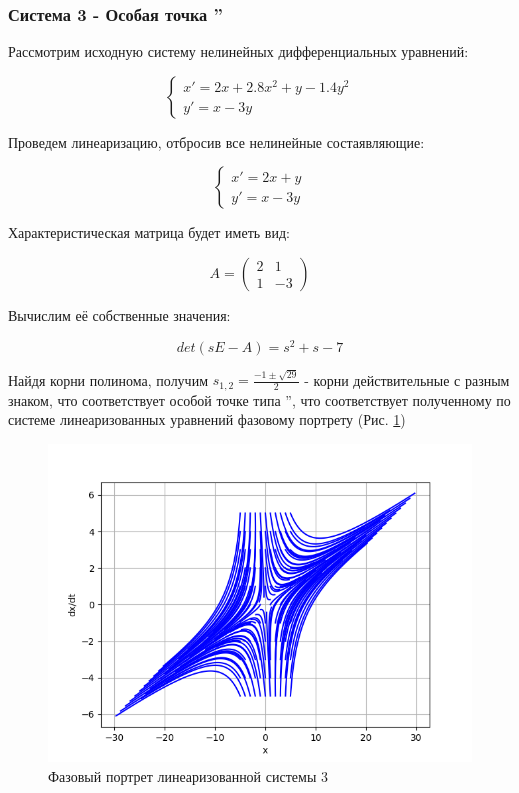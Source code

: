 \subsubsection{Система 3 - Особая точка \textquotedblright}

Рассмотрим исходную систему нелинейных дифференциальных уравнений:

$$
\begin{cases}
x' = 2x +  2.8x^2 + y - 1.4y^2\\
y' = x - 3y
\end{cases}
$$

Проведем линеаризацию, отбросив все нелинейные состаявляющие:

$$
\begin{cases}
	x' = 2x + y \\
	y' = x - 3y
\end{cases}
$$

Характеристическая матрица будет иметь вид:

$$
A = 
\begin{pmatrix}
	2 & 1 \\
	1 & -3
\end{pmatrix}
$$

Вычислим её собственные значения:

$$
det(sE - A) = s^2 + s - 7
$$

Найдя корни полинома, получим $s_{1,2} = \frac{-1\pm\sqrt{29}}{2}$ - корни действительные с разным знаком, 
что соответствует особой точке типа \textquotedblright, 
что соответствует полученному по системе линеаризованных уравнений фазовому портрету (Рис. \ref{fig:5})

\begin{figure}[H]
	\centering
	\includegraphics[width=0.6\linewidth]{body/images/Linearized-system-3.png}
	\caption{Фазовый портрет линеаризованной системы 3}
	\label{fig:5}
\end{figure}

